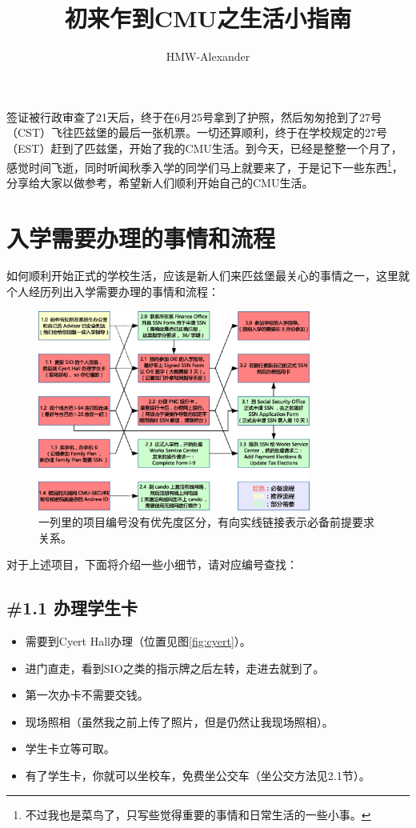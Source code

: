 \documentclass[letterpaper,10pt]{article}
\title{\textbf{初来乍到CMU之生活小指南}}
\author{HMW-Alexander}
\begin{document}
	\maketitle
	
	签证被行政审查了21天后，终于在6月25号拿到了护照，然后匆匆抢到了27号（CST）飞往匹兹堡的最后一张机票。一切还算顺利，终于在学校规定的27号（EST）赶到了匹兹堡，开始了我的CMU生活。到今天，已经是整整一个月了，感觉时间飞逝，同时听闻秋季入学的同学们马上就要来了，于是记下一些东西\footnote{不过我也是菜鸟了，只写些觉得重要的事情和日常生活的一些小事。}，分享给大家以做参考，希望新人们顺利开始自己的CMU生活。
		
	\section{入学需要办理的事情和流程}
	
	如何顺利开始正式的学校生活，应该是新人们来匹兹堡最关心的事情之一，这里就个人经历列出入学需要办理的事情和流程：
	
	\begin{figure}[!h]
		\centering
		\includegraphics[width=0.8\textwidth]{./img/flowchart}
		\caption{一列里的项目编号没有优先度区分，有向实线链接表示必备前提要求关系。}
		\label{fig:flowchart}
	\end{figure}
	
	对于上述项目，下面将介绍一些小细节，请对应编号查找：
	
	\subsection*{\#1.1 办理学生卡}
	
	\begin{itemize}
		\item 需要到Cyert Hall办理（位置见图\ref{fig:cyert}）。
		\item 进门直走，看到SIO之类的指示牌之后左转，走进去就到了。
		\item 第一次办卡不需要交钱。
		\item 现场照相（虽然我之前上传了照片，但是仍然让我现场照相）。
		\item 学生卡立等可取。
		\item 有了学生卡，你就可以坐校车，免费坐公交车（坐公交方法见2.1节）。
	\end{itemize}
	
\end{document}
